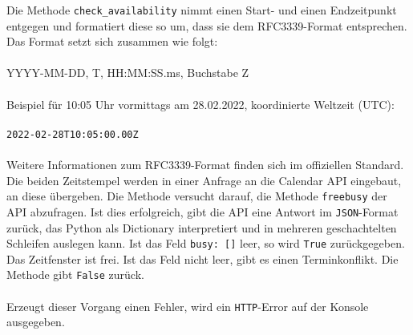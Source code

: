                 Die Methode \verb|check_availability| nimmt einen Start- und einen Endzeitpunkt entgegen und formatiert diese so um, dass sie dem RFC3339-Format entsprechen. Das Format setzt sich zusammen wie folgt: \\
                \\
                YYYY-MM-DD, \glq T\grq, HH:MM:SS.ms, Buchstabe \glq Z\grq \\
                \\
                Beispiel für 10:05 Uhr vormittags am 28.02.2022, koordinierte Weltzeit (UTC): \\
                \\
                \verb/2022-02-28T10:05:00.00Z/ \\
                \\
                Weitere Informationen zum RFC3339-Format finden sich im offiziellen Standard. \cite{date_time} \\

                Die beiden Zeitstempel werden in einer Anfrage an die Calendar API eingebaut, an diese übergeben. Die Methode versucht darauf, die Methode \verb|freebusy| der API abzufragen. Ist dies erfolgreich, gibt die API eine Antwort im \verb|JSON|-Format zurück, das Python als Dictionary interpretiert und in mehreren geschachtelten Schleifen auslegen kann. Ist das Feld \verb|busy: []| leer, so wird \verb|True| zurückgegeben. Das Zeitfenster ist frei. Ist das Feld nicht leer, gibt es einen Terminkonflikt. Die Methode gibt \verb|False| zurück. \\
                \\
                Erzeugt dieser Vorgang einen Fehler, wird ein \verb|HTTP|-Error auf der Konsole ausgegeben. 


